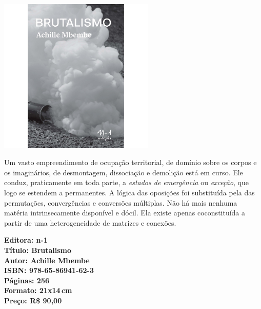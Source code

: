 \pagebreak

\begin{center}
\hspace*{-3.6cm}
\hspace*{3.1cm}\includegraphics[width=74mm]{./CAPAS/N-1_MBEMBE.jpg}
\end{center}

\hspace*{-7cm}\hrulefill\hspace*{-7cm}

\medskip

\noindent{} Um vasto empreendimento de ocupação territorial, de domínio sobre os corpos e os imaginários, de desmontagem, dissociação e demolição está em curso. Ele conduz, praticamente em toda parte, a \textit{estados de emergência} ou \textit{exceção}, que logo se estendem a permanentes.  A lógica das oposições foi substituída pela das permutações, convergências e conversões múltiplas. Não há mais nenhuma matéria intrinsecamente disponível e dócil. Ela existe apenas coconstituída a partir de uma heterogeneidade de matrizes e conexões.

\vfill

\hspace*{-.4cm}\begin{minipage}[c]{1\linewidth}
\small\textbf{
\hspace*{-.1cm}Editora: n-1\\
Título: Brutalismo\\
Autor: Achille Mbembe\\
ISBN: 978-65-86941-62-3\\
Páginas: 256\\
Formato: 21x14\,cm\\
Preço: R\$ 90,00\\
}
\end{minipage}

